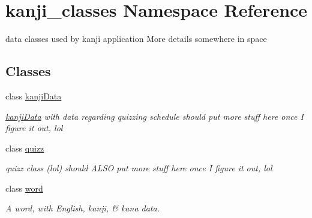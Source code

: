 \hypertarget{namespacekanji__classes}{}\section{kanji\+\_\+classes Namespace Reference}
\label{namespacekanji__classes}


data classes used by kanji application More details somewhere in space  


\subsection*{Classes}
\begin{DoxyCompactItemize}
\item 
class \mbox{\hyperlink{classkanji__classes_1_1kanji_data}{kanji\+Data}}
\begin{DoxyCompactList}\small\item\em \mbox{\hyperlink{classkanji__classes_1_1kanji_data}{kanji\+Data}} with data regarding quizzing schedule should put more stuff here once I figure it out, lol \end{DoxyCompactList}\item 
class \mbox{\hyperlink{classkanji__classes_1_1quizz}{quizz}}
\begin{DoxyCompactList}\small\item\em quizz class (lol) should A\+L\+SO put more stuff here once I figure it out, lol \end{DoxyCompactList}\item 
class \mbox{\hyperlink{classkanji__classes_1_1word}{word}}
\begin{DoxyCompactList}\small\item\em A word, with English, kanji, \& kana data. \end{DoxyCompactList}\end{DoxyCompactItemize}
